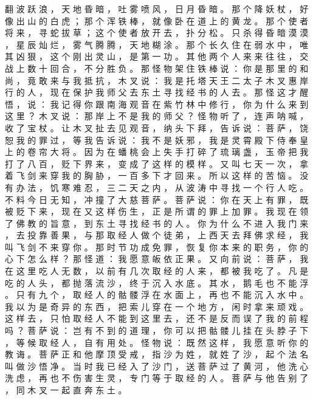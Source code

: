 {翻 波 跃 浪 ， 天 地 昏 暗 ， 吐 雾 喷 风 ， 日 月 昏 暗 。
那 个 降 妖 杖 ， 好 像 出 山 的 白 虎 ； 那 个 浑 铁 棒 ， 就 像 卧 在 道 上 的 黄 龙 。
那 个 使 者 将 来 ， 寻 蛇 拔 草 ； 这 个 使 者 放 开 去 ， 扑 分 松 。
只 杀 得 昏 暗 漠 漠 ， 星 辰 灿 烂 ， 雾 气 腾 腾 ， 天 地 糊 涂 。
那 个 长 久 住 在 弱 水 中 ， 唯 其 凶 狠 ， 这 个 刚 出 灵 山 ， 是 第 一 功 。
其 他 两 个 人 来 来 往 往 ， 交 战 上 数 十 回 合 ， 不 分 胜 负 。
那 怪 物 架 住 铁 棒 说 ： 你 是 那 里 的 和 尚 ， 竟 敢 来 与 我 抵 抗 ， 木 叉 说 ： 我 是 托 塔 天 王 二 太 子 木 叉 惠 岸 行 的 人 ， 现 在 保 护 我 师 父 去 东 土 寻 找 经 书 的 人 去 。
那 怪 这 才 醒 悟 ， 说 ： 我 记 得 你 跟 南 海 观 音 在 紫 竹 林 中 修 行 ， 你 为 什 么 来 到 这 里 ？ 木 叉 说 ： 那 岸 上 不 是 我 的 师 父 ？ 怪 物 听 了 ， 连 声 呐 喊 ， 收 了 宝 杖 。
让 木 叉 扯 去 见 观 音 ， 纳 头 下 拜 ， 告 诉 说 ： 菩 萨 ， 饶 恕 我 的 罪 过 ， 等 我 告 诉 说 ： 我 不 是 妖 邪 ， 我 是 灵 霄 殿 下 侍 奉 皇 上 的 卷 帘 大 将 。
因 为 在 蟠 桃 会 上 失 手 打 碎 了 琉 璃 盏 ， 玉 帝 把 我 打 了 八 百 ， 贬 下 界 来 ， 变 成 了 这 样 的 模 样 。
又 叫 七 天 一 次 ， 拿 着 飞 剑 来 穿 我 的 胸 胁 ， 一 百 多 下 才 回 来 。
所 以 这 样 的 苦 恼 。
没 有 办 法 ， 饥 寒 难 忍 ， 三 二 天 之 内 ， 从 波 涛 中 寻 找 一 个 行 人 吃 。
不 料 今 日 无 知 ， 冲 撞 了 大 慈 菩 萨 。
菩 萨 说 ： 你 在 天 上 有 罪 ， 既 被 贬 下 来 ， 现 在 又 这 样 伤 生 ， 正 是 所 谓 的 罪 上 加 罪 。
我 现 在 领 了 佛 教 的 旨 意 ， 到 东 土 寻 找 经 书 的 人 。
你 为 什 么 不 进 入 我 门 来 ， 去 投 靠 善 果 ， 与 那 取 经 人 做 个 徒 弟 ， 上 西 天 去 拜 佛 求 经 ， 我 叫 飞 剑 不 来 穿 你 。
那 时 节 功 成 免 罪 ， 恢 复 你 本 来 的 职 务 ， 你 的 心 下 怎 么 样 ？ 那 怪 道 ： 我 愿 意 皈 依 正 果 。
又 向 前 说 ： 菩 萨 ， 我 在 这 里 吃 人 无 数 ， 以 前 有 几 次 取 经 的 人 来 ， 都 被 我 吃 了 。
凡 是 吃 的 人 头 ， 都 抛 落 流 沙 ， 终 于 沉 入 水 底 。
其 水 ， 鹅 毛 也 不 能 浮 。
只 有 九 个 ， 取 经 人 的 骷 髅 浮 在 水 面 上 ， 再 也 不 能 沉 入 水 中 。
我 以 为 是 奇 异 的 东 西 ， 把 索 儿 穿 在 一 个 地 方 ， 闲 时 拿 来 顽 戏 。
这 样 去 ， 只 怕 取 经 人 不 能 到 这 里 去 ， 还 不 是 反 而 误 了 我 的 前 程 吗 ？ 菩 萨 说 ： 岂 有 不 到 的 道 理 ， 你 可 以 把 骷 髅 儿 挂 在 头 脖 子 下 ， 等 候 取 经 人 ， 自 有 用 处 。
怪 物 说 ： 既 然 这 样 ， 我 愿 意 听 你 的 教 诲 。
菩 萨 正 和 他 摩 顶 受 戒 ， 指 沙 为 姓 ， 就 姓 了 沙 ， 起 个 法 名 叫 做 沙 悟 净 。
当 时 我 已 经 入 了 沙 门 ， 送 菩 萨 过 了 黄 河 ， 他 洗 心 洗 虑 ， 再 也 不 伤 害 生 灵 ， 专 门 等 于 取 经 的 人 。
菩 萨 与 他 告 别 了 ， 同 木 叉 一 起 直 奔 东 土 。
}
